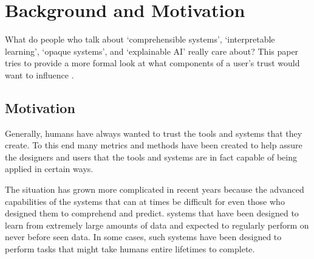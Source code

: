 \section{Background and Motivation} \label{sec:background}

What do people who talk about `comprehensible systems', `interpretable learning', `opaque systems', and `explainable AI' really care about? This paper tries to provide a more formal look at what components of a user's trust  would want to influence . 

\subsection{Motivation}
    Generally, humans have always wanted to trust the tools and systems that they create.  To this end many metrics and methods have been created to help assure the designers and users that the tools and systems are in fact capable of being applied in certain ways. 

    The situation has grown more complicated in recent years because the advanced capabilities of the systems that  can at times be difficult for even those who designed them to comprehend and predict.  systems that have been designed to learn from extremely large amounts of data and expected to regularly perform on never before seen data. In some cases, such systems have been designed to perform tasks that might take humans entire lifetimes to complete. 


